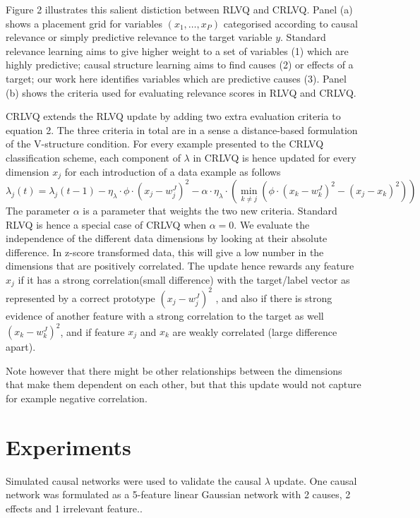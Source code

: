 \documentclass{esannV2}
\begin{document}
Figure 2 illustrates this salient distiction between RLVQ and CRLVQ. Panel (a) shows a placement grid for variables $(x_1, \ldots, x_P)$ categorised according to causal relevance or simply predictive relevance to the target variable $y$. Standard relevance learning aims to give higher weight to a set of variables (1) which are highly predictive; causal structure learning aims to find causes (2) or effects of a target; our work here identifies variables which are predictive causes (3). Panel (b) shows the criteria used for evaluating relevance scores in RLVQ and CRLVQ.
 
CRLVQ extends the RLVQ update by adding two extra evaluation criteria to equation 2. The three criteria in total are in a sense a distance-based formulation of the V-structure condition. For every example presented to the CRLVQ classification scheme, each component of $\lambda$ in CRLVQ is hence updated for every dimension $x_j$ for each introduction of a data example as follows
%
\begin{equation} 
\lambda_j(t) = \lambda_j(t-1) - \eta_\lambda \cdot \phi \cdot (x_j - w_j^J)^2 - \alpha \cdot \eta_\lambda \cdot \left( \min_{k \neq j}\left(\phi \cdot (x_k - w_k^J)^2 - (x_j - x_k)^2 \right) \right)
\end{equation}
%
The parameter $\alpha$ is a parameter that weights the two new criteria. Standard RLVQ is hence a special case of CRLVQ when $\alpha = 0$. We evaluate the independence of the different data dimensions by looking at their absolute difference. In z-score transformed data, this will give a low number in the dimensions that are positively correlated. The update hence rewards any feature $x_j$ if it has a strong correlation(small difference) with the target/label vector as represented by a correct prototype $(x_j - w_j^J)^2$ , and also if there is strong evidence of another feature with a strong correlation to the target as well $(x_k - w_k^J)^2$, and if feature $x_j$ and $x_k$ are weakly correlated (large difference apart).

Note however that there might be other relationships between the dimensions that make them dependent on each other, but that this update would not capture for example negative correlation. 

\section{Experiments}
\label{sec:Experiments}

Simulated causal networks were used to validate the causal $\lambda$ update. One causal network was formulated as a 5-feature linear Gaussian network with 2 causes, 2 effects and 1 irrelevant feature.. 
\end{document}

